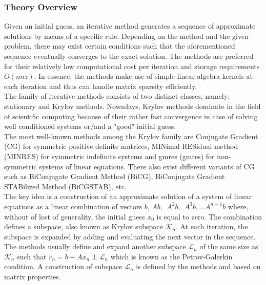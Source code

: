 \subsubsection{Theory Overview}
\label{subseq:iterative-theory}


Given an initial guess, an iterative method generates a sequence of approximate solutions by means of a specific rule. Depending on the method and the given problem, there may exist certain conditions such that the aforementioned sequence eventually converges to the exact solution. The methods are preferred for their relatively low computational cost per iteration and storage requirements $O(nnz)$. In essence, the methods make use of simple linear algebra kernels  at each iteration and thus can handle matrix sparsity efficiently.\\



The family of iterative methods consists of two distinct classes, namely: stationary and Krylov methods. Nowadays, Krylov methods dominate in the field of scientific computing because of their rather fast convergence in case of solving well conditioned systems or/and a "good" initial guess.\\


The most well-known methods among the Krylov family are Conjugate Gradient (CG) for symmetric positive definite matrices, MINimal RESidual method (MINRES) for symmetric indefinite systems and \acrlong{gmres} (\acrshort{gmres}) for non-symmetric systems of linear equations. There also exist different variants of CG such as BiConjugate Gradient Method (BiCG), BiConjugate Gradient STABilized Method (BiCGSTAB), etc.\\


The key idea is a construction of an approximate solution of a system of linear equations as a linear combination of vectors $b$, $Ab, \:\: A^2b, \:\: A^3b, \dots A^{n-1}b$ where, without of lost of generality, the initial guess $x_0$ is equal to zero. The combination defines a subspace, also known as Krylov subspace $\mathcal{K}_{n}$. At each iteration, the subspace is expanded by adding and evaluating the next vector in the sequence. The methods usually define and expand another subspace $\mathcal{L}_{n}$ of the same size as $\mathcal{K}_{n}$ such that $r_{n} = b - Ax_{n} \perp \mathcal{L}_{n}$ which is known as the Petrov-Galerkin condition. A construction of subspace $\mathcal{L}_{n}$ is defined by the methods and based on matrix properties.\\


